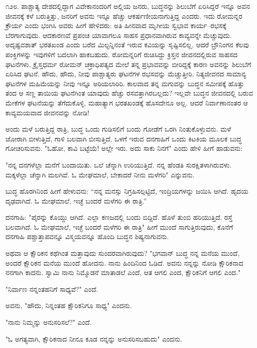 ೧೨೮. ಪಾಶ್ಚಾತ್ಯ ದೇಶದಲ್ಲಿದ್ದಾಗ ವಿವೇಕಾನಂದರಿಗೆ ಅಲ್ಲಿಯ ಜನರು, ಬುದ್ಧನನ್ನು ಶಿಲುಬೆಗೆ ಏರಿಸಿದ್ದರೆ ಇನ್ನೂ ಅವನ ಜೀವನಕ್ಕೆ ಕಳೆ ಬರುತ್ತಿತ್ತು, ಜನರಿಗೆ ಅವನು ಇನ್ನೂ ಹೆಚ್ಚು ಆಕರ್ಷಣೀಯನಾಗುತ್ತಿದ್ದ ಎಂದರು. ಇದು ರೋಮನ್ನರ ಕ್ರೌರ್ಯ ಎಂದು ಭಂಗಿಸಿ ಅವರು ಹೀಗೆ ಹೇಳಿದರು: ಅತಿ ಹೀನವಾದ ಮೃಗೀಯ ಸ್ವಭಾವ ಕಾರ್ಯ–ರಭಸಕ್ಕೆ ಬೆರಗಾಗುವುದು. ಆದಕಾರಣವೆ ಪ್ರಪಂಚ ಯಾವಾಗಲೂ ಸಾಹಸ ಪ್ರಧಾನವಾಗಿರುವ ಕಾವ್ಯವನ್ನೇ ಮೆಚ್ಚುವುದು. ಅದೃಷ್ಟವಶಾತ್ ಭರತಖಂಡ  ಎಂದು ಬರೆದ ಮಿಲ್ಟನ್ನಿನಂತೆ ಇರುವ ಕವಿಯನ್ನು ಸೃಷ್ಟಿಸಲಿಲ್ಲ. ಆದರೆ ಬ್ರೌನಿಂಗನ ಕೆಲವು ಪಂಕ್ತಿಗಳನ್ನು ಇವುಗಳಿಗೆ ಬದಲಾಗಿ ಹಾಕಬಹುದು. ರೋಮನ್ನರಿಗೆ ರುಚಿಸಿದ್ದು ಕ್ರಿಸ್ತನ ಜೀವನದಲ್ಲಿರುವ ಸಾಹಸದ ಘಟನೆಗಳು. ಕ್ರೈಸ್ತಧರ್ಮ ರೋಮನ್ ಚಕ್ರಾಧಿಪತ್ಯದ ಮೇಲೆ ತನ್ನ ಪ್ರಭಾವವನ್ನು ಬೀರಿದ್ದಕ್ಕೆ ಕಾರಣ ಅವನನ್ನು ಶಿಲುಬೆಗೆ ಏರಿಸಿದ ಘಟನೆ. ಹೌದು, ಹೌದು, ನೀವು ಪಾಶ್ಚಾತ್ಯರು ಘಟನೆಗಳ ರಭಸವನ್ನು ಮೆಚ್ಚುತ್ತೀರಿ. ನಿತ್ಯಜೀವನದ ಸಾಮಾನ್ಯ ಘಟನೆಗಳ ಮಹಿಮೆಯನ್ನು ನೀವು ಇನ್ನೂ ಅರಿಯಲಾರಿರಿ. ಕಾಲವಾದ ತನ್ನ ಮಗುವನ್ನು ಬುದ್ಧನ ಸಮೀಪಕ್ಕೆ ಹೊತ್ತು ತಂದ ಆ ಸಣ್ಣ ತಾಯಿಯ ಘಟನೆಗಿಂತ ಯಾವುದು ಹೆಚ್ಚು ರಸವತ್ತಾಗಿರಬಲ್ಲದು? ಇಲ್ಲವೇ ಬುದ್ಧನ ಜೀವನದಲ್ಲಿ ಬರುವ ಮೇಕೆಗಳ ಘಟನೆಯನ್ನು ತೆಗೆದುಕೊಳ್ಳಿ. ಮಹಾತ್ಯಾಗ ಭರತಖಂಡಕ್ಕೆ ಹೊಸದೇನೂ ಅಲ್ಲ. ಆದರೆ ನಿರ್ವಾಣಾನಂತರ ಆ ಕಾವ್ಯಮಯವಾದ ಜೀವನವನ್ನು ನೋಡಿ!

ಅಂದು ಮಳೆ ಬರುತ್ತಿದ್ದ ರಾತ್ರಿ, ಬುದ್ಧ ಒಂದು ಗುಡಿಸಲಿಗೆ ಬಂದು ಗೋಡೆಗೆ ಒರಗಿ ನಿಂತುಕೊಳ್ಳುವನು. ಮಳೆ ಜೋರಾಗಿ ಬೀಳುತ್ತಿದೆ, ಗಾಳಿ ಬಲವಾಗಿ ಬೀಸುತ್ತಿದೆ. ಒಳಗೆ ಇರುವ ದನಗಾಹಿಗೆ ಒಂದು ಕಿಟಕಿಯ ಮೂಲಕ ಬುದ್ಧ ಗೋಚರಿಸುವನು. "ಓಹೋ, ಕಾವಿ ಬಟ್ಟೆಯೆ! ಅಲ್ಲೇ ಇರು. ಅದು ಸಾಕು ನಿನಗೆ" ಎಂದು ಹೇಳಿ ಹೀಗೆ ಹಾಡುವನು:

"ನನ್ನ ದನಗಳೆಲ್ಲಾ ಮನೆಗೆ ಬಂದಾಯಿತು. ಒಲೆ ಚೆನ್ನಾಗಿ ಉರಿಯುತ್ತಿದೆ. ನನ್ನ ಹೆಂಡತಿ ಸುರಕ್ಷಿತಳಾಗಿರುವಳು. ಮಕ್ಕಳೆಲ್ಲಾ ಚೆನ್ನಾಗಿ ಮಲಗಿವೆ. ಓ ಮೇಘಮಾಲೆ, ಬೇಕಾದರೆ ನೀನು ಮಳೆಗರಿ" ಎನ್ನುವನು.

ಬುದ್ಧ ಹೊರಗಿನಿಂದ ಹೀಗೆ ಹೇಳುವನು: “ನನ್ನ ಮನಸ್ಸು ನಿಗ್ರಹಿಸಲ್ಪಟ್ಟಿದೆ, ಇಂದ್ರಿಯಗಳನ್ನು ಜಯಿಸಿ ಆಗಿದೆ. ಹೃದಯ ದೃಢವಾಗಿದೆ. ಓ ಮೇಘಮಾಲೆ, ಇಚ್ಛೆ ಬಂದರೆ ಮಳೆಗರಿ ಈ ರಾತ್ರಿ.”

ದನಗಾಹಿ: "ಪೈರನ್ನು ಕೊಯ್ದು ಆಗಿದೆ. ಎಲ್ಲಾ ಕಣಜದಲ್ಲಿ ಬಂದು ಬಿದ್ದಿದೆ. ಹೊಳೆ ತುಂಬಿ ಹರಿಯುತ್ತಿದೆ. ರಸ್ತೆ ಬಲವಾಗಿದೆ. ಓ ಮೇಘಮಾಲೆ, ಇಚ್ಛೆ ಬಂದರೆ ಮಳೆಗರಿ ಈ ರಾತ್ರಿ" ಹೀಗೆ ಮುಂದೆ ಸಾಗುತ್ತಿರುವುದು, ಕೊನೆಗೆ ದನಗಾಹಿ ಪಶ್ಚಾತ್ತಾಪವನ್ನೂ ವಿಸ್ಮಯವನ್ನೂ ಹೊಂದಿ ಬುದ್ಧನ ಶಿಷ್ಯನಾಗುವನು.

ಅಥವಾ ಆ ಕ್ಷೌರಿಕನ ಕಥೆಗಿಂತ ಮತ್ತಾವುದು ಸುಂದರವಾಗಿರುವುದು? "ಭಗವಾನ್ ಬುದ್ಧ ನನ್ನ ಮನೆಯ ಮುಂದೆ, ಅಂದರೆ ಕ್ಷೌರಿಕನ ಮನೆಯ ಮುಂದೆ ಹೋದನು. ನಾನು ಹಿಂದಿನಿಂದ ಓಡಿದೆ. ಅವನು ನನ್ನನ್ನು ನೋಡಿ ಕ್ಷೌರಿಕನಾದ ನನಗಾಗಿ ಕಾದನು. ಸ್ವಾಮಿ ನಾನು ನಿಮ್ಮೊಡನೆ ಮಾತಾಡಲೆ ಎಂದೆ, ಆತ ಆಗಲಿ ಎಂದ, ಕ್ಷೌರಿಕನಿಗೆ ಆಗಲಿ ಎಂದ."

"ನಿರ್ವಾಣ ನನ್ನಂತಹನಿಗೆ ಸಾಧ್ಯವೆ?" ಎಂದೆ.

ಅವನು, "ಹೌದು, ನಿನ್ನಂತಹ ಕ್ಷೌರಿಕನಿಗೂ ಸಾಧ್ಯ" ಎಂದನು.

"ನಾನು ನಿಮ್ಮನ್ನು ಅನುಸರಿಸಲೆ?" ಎಂದೆ.

"ಓ ಅಗತ್ಯವಾಗಿ, ಕ್ಷೌರಿಕನಾದ ನೀನೂ ಕೂಡ ನನ್ನನ್ನು ಅನುಸರಿಸಬಹುದು" ಎಂದನು.

